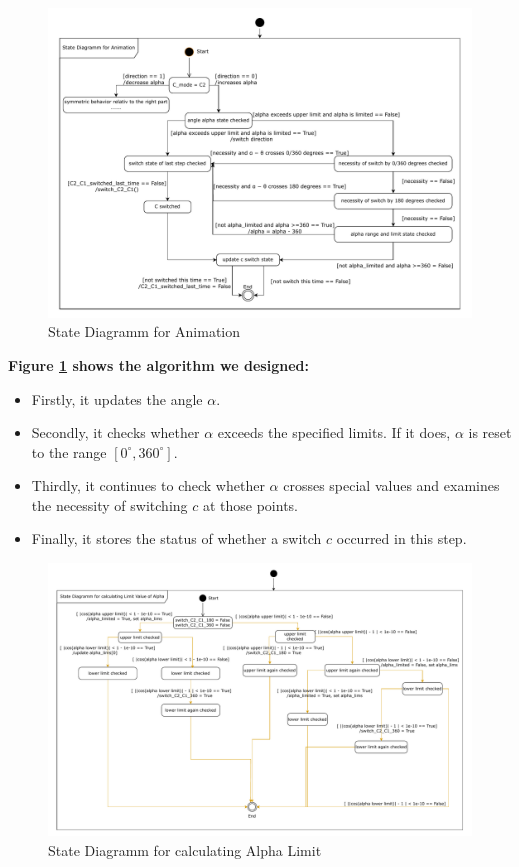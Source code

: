 \documentclass{article}
\begin{document}
\begin{figure}[h]
    \centering
    \includegraphics[width=\textwidth]{./figures/animation_state_diagramm_1.pdf}
    \caption{State Diagramm for Animation}
    \label{fig:state_diagramm_of_animation_alpha}
\end{figure}

\textbf{Figure \ref{fig:state_diagramm_of_animation_alpha} shows the algorithm we designed:}
\begin{itemize}
    \item Firstly, it updates the angle \(\alpha\).
    \item Secondly, it checks whether \(\alpha\) exceeds the specified limits. If it does, \(\alpha\) is reset to the range \([0^\circ, 360^\circ]\).
    \item Thirdly, it continues to check whether \(\alpha\) crosses special values and examines the necessity of switching \(c\) at those points.
    \item Finally, it stores the status of whether a switch \(c\) occurred in this step.
\end{itemize}

\begin{figure}[h]
    \centering
    \includegraphics[width=\textwidth]{./figures/state_diagramm_calculate_alpha_limit_1.pdf}
    \caption{State Diagramm for calculating Alpha Limit}
    \label{fig:state_diagramm_calculate_alpha_limit}
\end{figure}
\end{document}
